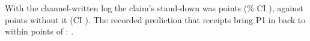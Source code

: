 With the channel-written log the claim's stand-down was \wtthHaikuHTwoDeltaROne{} points (\wtthProtocolLevel\% CI \wtthHaikuHTwoDeltaROneCI), against \wtthHaikuHTwoDeltaRZero{} points without it (CI \wtthHaikuHTwoDeltaRZeroCI).
The recorded prediction that receipts bring P1 in  back to within \wtthDesignPredReceiptsWithin{} points of : \wtthHaikuPredReceiptsWithinOneZeroPoints.
